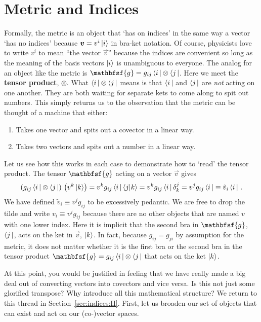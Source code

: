 \documentclass[
  11pt,
	colorful,
	raggedright,
]{tufte-style-thesis-flip}
\newcommand{\tens}[1]{\mathbfsf{#1}}
\begin{document}
\section{Metric and Indices}
\label{sec:indices:I}

Formally, the metric is an object that `has on indices' in the same way a vector `has no indices' because $\boldsymbol{v} = v^i\left|i\right\rangle$ in bra-ket notation. Of course, physicists love to write $v^i$ to mean ``the vector $\vec{v}$'' because the indices are convenient so long as the meaning of the basis vectors $\left|i\right\rangle$ is unambiguous to everyone. The analog for an object like the metric is $\tens{g} = g_{ij}\bra{i}\otimes\bra{j}$. Here we meet the \textbf{tensor product}, $\otimes$. What $\left\langle i\,\right|\otimes\left\langle j\,\right|$ means is that $\left\langle i\,\right|$ and $\left\langle j\,\right|$ are \emph{not} acting on one another. They are both waiting for separate kets to come along to spit out numbers. This simply returns us to the observation that the metric can be thought of a machine that either:
\begin{enumerate}
  \item Takes one vector and spits out a covector in a linear way.
  \item Takes two vectors and spits out a number in a linear way.
\end{enumerate}
Let us see how this works in each case to demonstrate how to `read' the tensor product. The tensor $\tens{g}$ acting on a vector $\vec{v}$ gives
\begin{align}
  \left(g_{ij}\left\langle i\,\right|\otimes\left\langle j\,\right|\right) \, \left(v^k\left|k\right\rangle\right) 
  = v^k g_{ij}\left\langle i\,\right| \langle j | k\rangle 
  = v^k g_{ij}\left\langle i\,\right| \delta^j_k
  = v^j g_{ij}\left\langle i\,\right| 
  \equiv \tilde v_i \left\langle i\,\right| \, .
\end{align}
We have defined $\tilde v_i \equiv v^j g_{ij}$ to be excessively pedantic. We are free to drop the tilde and write $v_i \equiv v^j g_{ij}$ because there are no other objects that are named $v$ with one lower index.
Here it is implicit that the second bra in $\tens{g}$, $\left\langle j\,\right|$, acts on the ket in $\vec{v}$, $\left|k\right\rangle$. In fact, because $g_{ij} = g_{ji}$ by assumption for the metric, it does not matter whether it is the first bra or the second bra in the tensor product $\tens{g} = g_{ij}\bra{i}\otimes\bra{j}$ that acts on the ket $\left|k\right\rangle$. 

At this point, you would be justified in feeling that we have really made a big deal out of converting vectors into covectors and vice versa. Is this not just some glorified transpose? Why introduce all this mathematical structure? We return to this thread in Section~\ref{sec:indices:II}. First, let us broaden our set of objects that can exist and act on our (co-)vector spaces.
\end{document}
